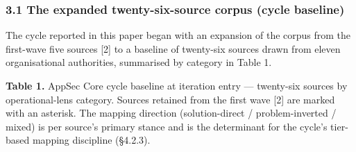 \documentclass[
]{article}
\begin{document}
\subsubsection{3.1 The expanded twenty-six-source corpus (cycle
baseline)}\label{the-expanded-twenty-six-source-corpus-cycle-baseline}

The cycle reported in this paper began with an expansion of the corpus
from the first-wave five sources {[}2{]} to a baseline of twenty-six
sources drawn from eleven organisational authorities, summarised by
category in Table 1.

\textbf{Table 1.} AppSec Core cycle baseline at iteration entry ---
twenty-six sources by operational-lens category. Sources retained from
the first wave {[}2{]} are marked with an asterisk. The mapping
direction (solution-direct / problem-inverted / mixed) is per source's
primary stance and is the determinant for the cycle's tier-based mapping
discipline (§4.2.3).
\end{document}
